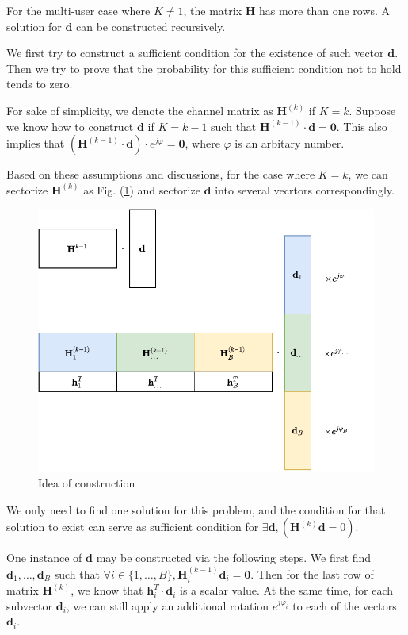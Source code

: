 \documentclass[12pt,draftclsnofoot,onecolumn,journal]{IEEEtran}
\begin{document}
 For the multi-user case where $K\neq 1$, the matrix $\mathbf H$ has more than one rows. A solution for $\mathbf d$ can be constructed recursively. 

We first try to construct a sufficient condition for the existence of such vector $\mathbf d$. Then we try to prove that the probability for this sufficient condition not to hold tends to zero. 

For sake of simplicity, we denote the channel matrix as $\mathbf H^{(k)}$ if $K=k$. Suppose we know how to construct $\mathbf d$ if $K=k-1$ such that $\mathbf H^{(k-1)}\cdot \mathbf d=\mathbf 0$. This also implies that $(\mathbf H^{(k-1)}\cdot \mathbf d)\cdot e^{j\varphi}=\mathbf 0$, where $\varphi$ is an arbitary number.
 
  Based on these assumptions and discussions, for the case where $K=k$, we can sectorize $\mathbf H^{(k)}$ as Fig. (\ref{fig:idea}) and sectorize $\mathbf d$ into several vecrtors correspondingly.
\begin{figure}
\includegraphics[width=5in]{ideaofproof.pdf} 
\caption{Idea of construction}
\label{fig:idea}
\end{figure}


We only need to find one solution for this problem, and the condition for that solution to exist can serve as sufficient condition for $\exists \mathbf d,(\mathbf H^{(k)} \mathbf d=0)$. 

One instance of $\mathbf d$ may be constructed via the following steps. We first find $\mathbf d_1, \dots, \mathbf d_B$ such that $\forall i\in\{1,\dots, B\},\mathbf H^{(k-1)}_i\mathbf d_i=\mathbf 0$. Then for the last row of matrix $\mathbf H^{(k)}$, we know that $\mathbf h_i^T\cdot \mathbf d_i$ is a scalar value. At the same time, for each subvector $\mathbf d_i$, we can still apply an additional rotation $e^{j\varphi_i}$ to each of the vectors $\mathbf d_i$.
\end{document}
